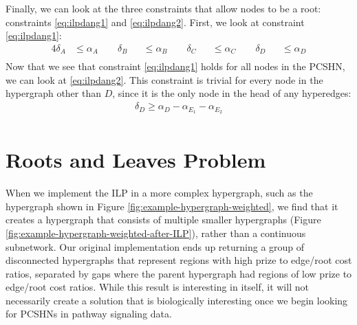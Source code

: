 \documentclass[12pt,twoside]{reedthesis}
\theoremstyle{definition}
\begin{document}
Finally, we can look at the three constraints that allow nodes to be a root: constraints \eqref{eq:ilpdang1} and \eqref{eq:ilpdang2}. First, we look at constraint \eqref{eq:ilpdang1}:
\begin{alignat*}{4}
  \delta_A &\leq \alpha_A \qquad \delta_B &&\leq \alpha_B \qquad \delta_C &&\leq \alpha_C \qquad \delta_D &&\leq \alpha_D\\
\end{alignat*}%
Now that we see that constraint \eqref{eq:ilpdang1} holds for all nodes in the PCSHN, we can look at \ref{eq:ilpdang2}. This constraint is trivial for every node in the hypergraph other than $D$, since it is the only node in the head of any hyperedges:
\begin{align*}
 \delta_D \geq \alpha_{D} - \alpha_{E_1} - \alpha_{E_2}\\
\end{align*}%


\section{Roots and Leaves Problem}

When we implement the ILP in a more complex hypergraph, such as the hypergraph shown in Figure \ref{fig:example-hypergraph-weighted}, we find that it creates a hypergraph that consists of multiple smaller hypergraphs (Figure \ref{fig:example-hypergraph-weighted-after-ILP}), rather than a continuous subnetwork. Our original implementation ends up returning a group of disconnected hypergraphs that represent regions with high prize to edge/root cost ratios, separated by gaps where the parent hypergraph had regions of low prize to edge/root cost ratios. While this result is interesting in itself, it will not necessarily create a solution that is biologically interesting once we begin looking for PCSHNs in pathway signaling data.\par
\end{document}
